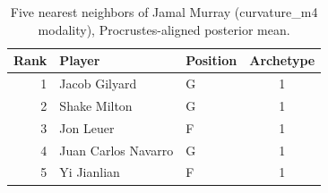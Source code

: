 \begin{table}[htbp]
  \centering\small
  \begin{tabular}{rllc}
    \toprule
    Rank & Player & Position & Archetype \\
    \midrule
    1 & Jacob Gilyard & G & 1 \\
    2 & Shake Milton & G & 1 \\
    3 & Jon Leuer & F & 1 \\
    4 & Juan Carlos Navarro & G & 1 \\
    5 & Yi Jianlian & F & 1 \\
    \bottomrule
  \end{tabular}
  \caption{Five nearest neighbors of Jamal Murray (curvature_m4 modality), Procrustes-aligned posterior mean.}
  \label{tab:Jamal_Murray_neighbors_curvature_m4}
\end{table}

